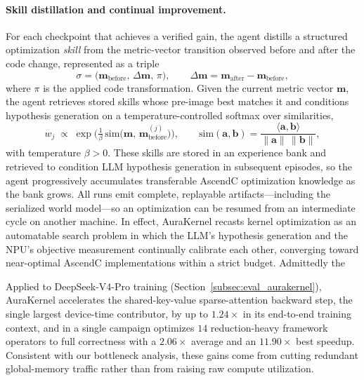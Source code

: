 \paragraph{Skill distillation and continual improvement.}
For each checkpoint that achieves a verified gain, the agent distills a structured optimization \emph{skill} from the metric-vector transition observed before and after the code change, represented as a triple
\begin{equation}
\sigma=\big(\mathbf{m}_{\mathrm{before}},\,\Delta\mathbf{m},\,\pi\big),
\qquad \Delta\mathbf{m}=\mathbf{m}_{\mathrm{after}}-\mathbf{m}_{\mathrm{before}},
\label{eq:skill-tuple}
\end{equation}
where $\pi$ is the applied code transformation. Given the current metric vector $\mathbf{m}$, the agent retrieves stored skills whose pre-image best matches it and conditions hypothesis generation on a temperature-controlled softmax over similarities,
\begin{equation}
w_j\;\propto\;\exp\!\Big(\tfrac{1}{\beta}\,\mathrm{sim}\big(\mathbf{m},\,\mathbf{m}^{(j)}_{\mathrm{before}}\big)\Big),
\qquad
\mathrm{sim}(\mathbf{a},\mathbf{b})=\frac{\langle\mathbf{a},\mathbf{b}\rangle}{\lVert\mathbf{a}\rVert\,\lVert\mathbf{b}\rVert},
\label{eq:skill-weight}
\end{equation}
with temperature $\beta>0$. These skills are stored in an experience bank and retrieved to condition LLM hypothesis generation in subsequent episodes, so the agent progressively accumulates transferable AscendC optimization knowledge as the bank grows. All runs emit complete, replayable artifacts---including the serialized world model---so an optimization can be resumed from an intermediate cycle on another machine. In effect, AuraKernel recasts kernel optimization as an automatable search problem in which the LLM's hypothesis generation and the NPU's objective measurement continually calibrate each other, converging toward near-optimal AscendC implementations within a strict budget. Admittedly the 

Applied to DeepSeek-V4-Pro training (Section~\ref{subsec:eval_aurakernel}), AuraKernel accelerates the shared-key-value sparse-attention backward step, the single largest device-time contributor, by up to $1.24\times$ in its end-to-end training context, and in a single campaign optimizes $14$ reduction-heavy framework operators to full correctness with a $2.06\times$ average and an $11.90\times$ best speedup. Consistent with our bottleneck analysis, these gains come from cutting redundant global-memory traffic rather than from raising raw compute utilization.

